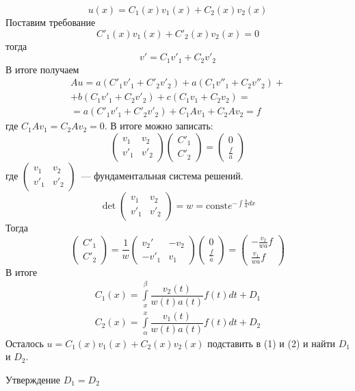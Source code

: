 \documentclass[14pt]{extarticle}
\newcommand{\vect}[2]{\left(
\begin{array}{c}
    #1\\
    #2
\end{array}\right)}
\begin{document}
\begin{Proof}
    $$
    u(x) = C_1(x)v_1(x) + C_2(x)v_2(x)
    $$
    Поставим требование
    $$
    C'_1(x)v_1(x) + C'_2(x)v_2(x) = 0
    $$
    тогда
    $$
    v' = C_1 v'_1 + C_2 v'_2
    $$
    В итоге  получаем
    \begin{multline*}
        Au = a(C'_1v'_1 + C'_2v'_2) + a(C_1 v''_1 + C_2 v''_2) 
    +\\+ b(C_1 v'_1 + C_2 v'_2) + c(C_1 v_1 + C_2 v_2) =\\=
    a(C'_1v'_1 + C'_2v'_2) + C_1 Av_1 + C_2 Av_2 = f
    \end{multline*}
    где $C_1Av_1 = C_2 A v_2 = 0$.
    В итоге можно записать:
    $$
    \left(
    \begin{array}{cc}
        v_1 & v_2\\
        v'_1 & v'_2
    \end{array}
    \right)
    \vect{C'_1}{C'_2}
    =
    \vect{0}{\frac{f}{a}}
    $$
    где $
    \left(
    \begin{array}{cc}
        v_1 & v_2\\
        v'_1 & v'_2
    \end{array}
    \right)$~--- фундаментальная система решений.
    $$
    \det
    \left(
    \begin{array}{cc}
        v_1 & v_2\\
        v'_1 & v'_2
    \end{array}
    \right) = w = \mathrm{const} e^{-\int \frac{b}{a} dx}
    $$
    Тогда
    $$
    \vect{C'_1}{C'_2} = \dfrac{1}{w}
    \left(
    \begin{array}{cc}
        v_2' & -v_2\\
        -v'_1 & v_1
    \end{array}
    \right)
    \vect{0}{\frac{f}{a}}
    =
    \vect{-\frac{v_2}{wa}f}{\frac{v_1}{wa}f}
    $$
    В итоге
    \begin{gather*}
        C_1(x) = \int \limits_x^\beta \dfrac{v_2(t)}{w(t)a(t)}f(t)dt + D_1\\
        C_2(x) = \int \limits_\alpha^x \dfrac{v_1(t)}{w(t)a(t)}f(t)dt + D_2
    \end{gather*}
    Осталось $u = C_1(x)v_1(x) + C_2(x)v_2(x)$ подставить в (1) и (2) и найти $D_1$ и $D_2$.
    \begin{MathCl}{Утверждение}
        $D_1 = D_2$
    \end{MathCl}
\end{Proof}
\end{document}
